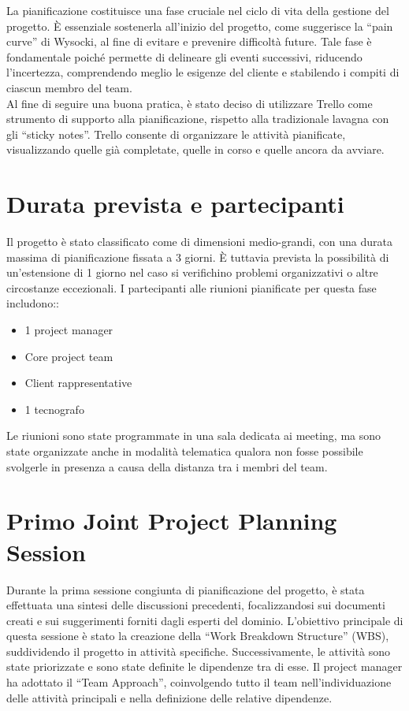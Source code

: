 \documentclass[a4paper,12pt, openright]{report}
\begin{document}
La pianificazione costituisce una fase cruciale nel ciclo di vita della gestione del progetto. È essenziale sostenerla all'inizio del progetto, come suggerisce la ``pain curve'' di Wysocki, al fine di evitare e prevenire difficoltà future. Tale fase è fondamentale poiché permette di delineare gli eventi successivi, riducendo l'incertezza, comprendendo meglio le esigenze del cliente e stabilendo i compiti di ciascun membro del team.\\
Al fine di seguire una buona pratica, è stato deciso di utilizzare Trello come strumento di supporto alla pianificazione, rispetto alla tradizionale lavagna con gli ``sticky notes''. Trello consente di organizzare le attività pianificate, visualizzando quelle già completate, quelle in corso e quelle ancora da avviare.

\section{Durata prevista e partecipanti}
Il progetto è stato classificato come di dimensioni medio-grandi, con una durata massima di pianificazione fissata a 3 giorni. È tuttavia prevista la possibilità di un'estensione di 1 giorno nel caso si verifichino problemi organizzativi o altre circostanze eccezionali. I partecipanti alle riunioni pianificate per questa fase includono::
\begin{itemize}
    \item 1 project manager
    \item Core project team
    \item Client rappresentative
    \item 1 tecnografo
\end{itemize}

Le riunioni sono state programmate in una sala dedicata ai meeting, ma sono state organizzate anche in modalità telematica qualora non fosse possibile svolgerle in presenza a causa della distanza tra i membri del team.

\section{Primo Joint Project Planning Session}

Durante la prima sessione congiunta di pianificazione del progetto, è stata effettuata una sintesi delle discussioni precedenti, focalizzandosi sui documenti creati e sui suggerimenti forniti dagli esperti del dominio. L'obiettivo principale di questa sessione è stato la creazione della ``Work Breakdown Structure'' (WBS), suddividendo il progetto in attività specifiche. Successivamente, le attività sono state priorizzate e sono state definite le dipendenze tra di esse. Il project manager ha adottato il ``Team Approach'', coinvolgendo tutto il team nell'individuazione delle attività principali e nella definizione delle relative dipendenze.
\end{document}
